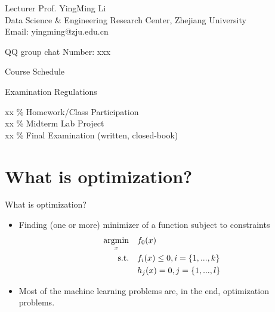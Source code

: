\documentclass[notes]{beamer}
\begin{document}


\begin{frame}
	\begin{block}{Lecturer}
		Prof. YingMing Li  \\
		Data Science \& Engineering Research Center, Zhejiang University \\
		Email: \textrm{yingming@zju.edu.cn}
	\end{block}
	\begin{block}{QQ group chat}
		Number: xxx
	\end{block}
\end{frame}

\begin{frame}{Course Schedule}
\end{frame}

\begin{frame}
	{Examination Regulations}

	xx \% Homework/Class Participation \\
	xx \% Midterm Lab Project \\
	xx \% Final Examination (written, closed-book)
\end{frame}

\section{What is optimization?}

\begin{frame}{What is optimization?}
	\begin{itemize}
		\item<1-> Finding (one or more)  minimizer of a function subject to constraints
		      \begin{equation}
			      \begin{aligned}
				      \mathop{\mathrm{argmin}}_x \quad     & f_0(x)                        \\
				      \textrm{s.t.} \quad & f_i(x) \le 0, i = \{1,...,k\} \\
				      \quad               & h_j(x) = 0, j = \{1,...,l\}   \\
			      \end{aligned}
		      \end{equation}
		\item<2-> Most of the machine learning problems are, in the end, optimization problems.
	\end{itemize}
\end{frame}
\end{document}
